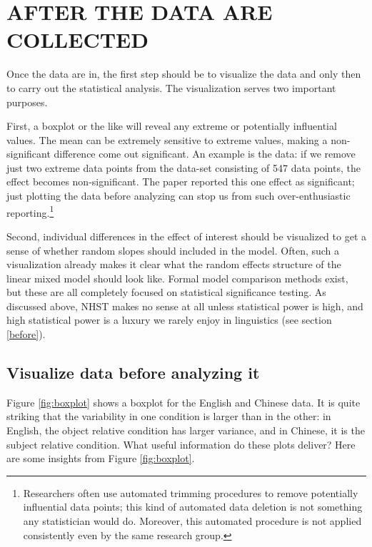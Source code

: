 \documentclass{ar-1col}\usepackage[]{graphicx}\usepackage[]{color}
\begin{document}
\section{AFTER THE DATA ARE COLLECTED}

Once the data are in, the first step should be to visualize the data and only then to carry out the statistical analysis. The visualization serves two important purposes. 

First, a boxplot or the like will reveal any extreme or potentially influential values. The mean can be extremely sensitive to extreme values, making a non-significant difference come out significant. An example is the \citet{gibsonwu} data: if we remove just two extreme data points from the data-set consisting of 547 data points, the effect becomes non-significant. The \citet{gibsonwu} paper reported this one effect as significant; just plotting the data before analyzing can stop us from such over-enthusiastic reporting.\footnote{Researchers often use automated trimming procedures to remove potentially influential data points; this kind of automated data deletion is not something any statistician would do. Moreover, this automated procedure is not applied consistently even by the same research group.} 

Second, individual differences in the effect of interest should be visualized to get a sense of whether random slopes should included in the model. Often, such a visualization already makes it clear what the random effects structure of the linear mixed model should look like. Formal model comparison methods exist, but these are all completely focused on statistical significance testing. As discussed above, NHST makes no sense at all unless statistical power is high, and high statistical power is a luxury we rarely enjoy in linguistics (see section \ref{before}).  

\subsection{Visualize data before analyzing it}

Figure \ref{fig:boxplot} shows a boxplot for the English and Chinese data. It is quite striking that the variability in one condition is larger than in the other: in English, the object relative condition has larger variance, and in Chinese, it is the subject relative condition. What useful information do these plots deliver? Here are some insights from Figure \ref{fig:boxplot}.
\end{document}

